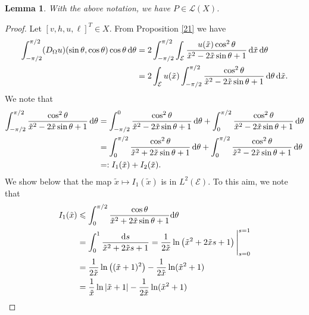 \documentclass{amsart} %
\numberwithin{equation}{section}
\newtheorem{lemma}[theorem]{Lemma}
\theoremstyle{definition}
\begin{document}
\begin{lemma}\label{P_perturbation}
With the above notation, we have $P\in\mathcal{L}(X)$.
\end{lemma}
\begin{proof}
   Let $[v,h,u,\ell]^T\in X$. From Proposition \ref{21} we have 
\begin{equation}\label{first_eq_lemma_pert}
\begin{aligned}
 \int_{-\pi/2}^{\pi/2}(D_{\Omega}u)(\sin\theta,\cos\theta)\cos\theta\,{\rm d}\theta&= 2\int_{-\pi/2}^{\pi/2} \int_{\mathcal{E}}\frac{u(\tilde x)\cos^2\theta}{\tilde x^2-2\tilde x\sin\theta +1}\,{\rm d}\tilde x\,{\rm d}\theta\\
 &= 2\int_{\mathcal{E}}u(\tilde x)\int_{-\pi/2}^{\pi/2}\frac{\cos^2\theta}{\tilde x^2-2\tilde x\sin\theta +1}\,{\rm d}\theta\,{\rm d}\tilde x.
\end{aligned}
\end{equation}
We note that
\begin{equation}
\begin{aligned}
\int_{-\pi/2}^{\pi/2}\frac{\cos^2\theta}{\tilde x^2-2\tilde x\sin\theta +1}\,{\rm d}\theta&=\int_{-\pi/2}^{0}\frac{\cos^2\theta}{\tilde x^2-2\tilde x\sin\theta +1}\,{\rm d}\theta+\int_{0}^{\pi/2}\frac{\cos^2\theta}{\tilde x^2-2\tilde x\sin\theta +1}\,{\rm d}\theta\\
&=\int_{0}^{\pi/2}\frac{\cos^2\theta}{\tilde x^2+2\tilde x\sin\theta +1}\,{\rm d}\theta+\int_{0}^{\pi/2}\frac{\cos^2\theta}{\tilde x^2-2\tilde x\sin\theta +1}\,{\rm d}\theta\\
&=: I_1(\tilde x)+I_2(\tilde x).
\end{aligned}
\end{equation}
We show below that the map $\tilde x\mapsto I_1(\tilde x)$ is in $L^2(\mathcal{E})$. To this aim, we note that
\begin{equation}\label{bound_I1}
\begin{aligned}
 I_1(\tilde x) &\leqslant \int_{0}^{\pi/2}\frac{\cos\theta}{\tilde x^2+2\tilde x\sin\theta+1}{\rm d}\theta\\
 &=\int_0^1\frac{{\rm d}s}{\tilde x^2+2\tilde xs+1}=\frac{1}{2\tilde x}\ln\left(\tilde x^2+2\tilde x s+1\right)\Bigg|_{s=0}^{s=1}\\
 &=\frac{1}{2\tilde x}\ln\left((\tilde x+1)^2\right)-\frac{1}{2\tilde x}\ln(\tilde x^2+1)\\
 &= \frac{1}{\tilde x}\ln|\tilde x+1|-\frac{1}{2\tilde x}\ln(\tilde x^2+1)
\end{aligned}
\end{equation}

\end{proof}
\end{document}
